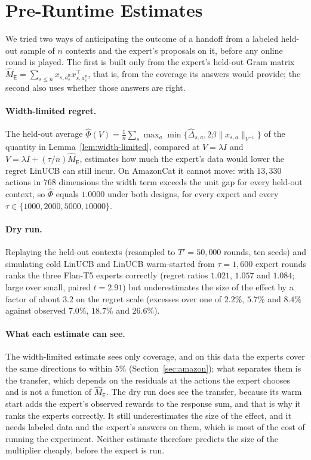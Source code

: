 \documentclass[anon]{alt2027} %
\newcommand{\Exp}{\mathsf{E}}
\begin{document}
\section{Pre-Runtime Estimates}
\label{app:diagnostics}

We tried two ways of anticipating the outcome of a handoff from a labeled
held-out sample of $n$ contexts and the expert's proposals on it, before any
online round is played. The first is built only from the expert's held-out
Gram matrix
$\widehat M_{\Exp}=\sum_{s\le n}x_{s,a_s^{\Exp}}x_{s,a_s^{\Exp}}^\top$, that is,
from the coverage its answers would provide; the second also uses whether
those answers are right.

\paragraph{Width-limited regret.} The held-out average
$\widehat\Phi(V)=\frac1n\sum_s\max_a\min\{\widehat\Delta_{s,a},2\beta\|x_{s,a}\|_{V^{-1}}\}$
of the quantity in Lemma~\ref{lem:width-limited}, compared at
$V=\lambda I$ and $V=\lambda I+(\tau/n)\widehat M_{\Exp}$, estimates how much
the expert's data would lower the regret LinUCB can still incur. On AmazonCat
it cannot move: with $13{,}330$ actions in $768$ dimensions the width term
exceeds the unit gap for every held-out context, so $\widehat\Phi$ equals
$1.0000$ under both designs, for every expert and every
$\tau\in\{1000,2000,5000,10000\}$.

\paragraph{Dry run.} Replaying the held-out contexts (resampled to
$T'=50{,}000$ rounds, ten seeds) and simulating cold LinUCB and LinUCB
warm-started from $\tau=1{,}600$ expert rounds ranks the three Flan-T5 experts
correctly (regret ratios $1.021$, $1.057$ and $1.084$; large over small,
paired $t=2.91$) but underestimates the size of the effect by a factor of
about $3.2$ on the regret scale (excesses over one of $2.2\%$, $5.7\%$ and
$8.4\%$ against observed $7.0\%$, $18.7\%$ and $26.6\%$).

\paragraph{What each estimate can see.} The width-limited estimate sees only
coverage, and on this data the experts cover the same directions to within
$5\%$ (Section~\ref{sec:amazon}); what separates them is the transfer, which
depends on the residuals at the actions the expert chooses and is not a
function of $\widehat M_{\Exp}$. The dry run does see the transfer, because
its warm start adds the expert's observed rewards to the response sum, and
that is why it ranks the experts correctly. It still underestimates the size
of the effect, and it needs labeled data and the expert's answers on them,
which is most of the cost of running the experiment. Neither estimate
therefore predicts the size of the multiplier cheaply, before the expert is
run.
\end{document}
